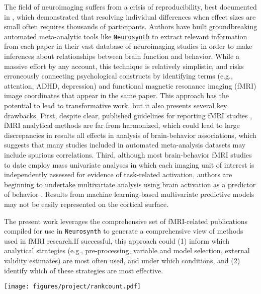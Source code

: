 The field of neuroimaging suffers from a crisis of reproducibility, best documented in \cite{MarekEtAl2022}, which demonstrated that resolving individual differences when effect sizes are small often requires thousands of participants. Authors have built groundbreaking automated meta-analytic tools like \href{https://neurosynth.org/}{\texttt{Neurosynth}} \cite{YarkoniEtAl2011} to extract relevant information from each paper in their vast database of neuroimaging studies in order to make inferences about relationships between brain function and behavior. While a massive effort by any account, this technique is relatively simplistic, and risks erroneously connecting psychological constructs by identifying terms (e.g., attention, ADHD, depression) and functional magnetic resonance imaging (fMRI) image coordinates that appear in the same paper. This approach has the potential to lead to transformative work, but it also presents several key drawbacks. First, despite clear, published guidelines for reporting fMRI studies \cite{PoldrackEtAl2008}, fMRI analytical methods are far from harmonized, which could lead to large discrepancies in results \cite{Botvinik-NezerEtAl2020} all effects in analysis of brain-behavior associations, which suggests that many studies included in automated meta-analysis datasets may include spurious correlations. Third, although most brain-behavior fMRI studies to date employ mass univariate analyses in which each imaging unit of interest is independently assessed for evidence of task-related activation, authors are beginning to undertake multivariate analysis using brain activation as a predictor of behavior \cite[e.g.,][]{YuanEtAl2023}. Results from machine learning-based multivariate predictive models may not be easily represented on the cortical surface. 	

The present work leverages the comprehensive set of fMRI-related publications compiled for use in \texttt{Neurosynth} \cite{YarkoniEtAl2011} to generate a comprehensive view of methods used in fMRI research.If successful, this approach could (1) inform which analytical strategies (e.g., pre-processing, variable and model selection, external validity estimates) are most often used, and under which conditions, and (2) identify which of these strategies are most effective. 


\begin{figure*}[tp!]
  \centering	
    \texttt{[image: figures/project/rankcount.pdf]}  
  \caption{
  }
  \label{fig:papertag.}
\end{figure*}

